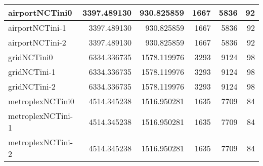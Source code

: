 \begin{longtable}{|l|r|r|r|r|r|}
airportNCTini0 & 3397.489130 & 930.825859 & 1667 & 5836 & 92 \\ \hline
airportNCTini-1 & 3397.489130 & 930.825859 & 1667 & 5836 & 92 \\ \hline
airportNCTini-2 & 3397.489130 & 930.825859 & 1667 & 5836 & 92 \\ \hline
gridNCTini0 & 6334.336735 & 1578.119976 & 3293 & 9124 & 98 \\ \hline
gridNCTini-1 & 6334.336735 & 1578.119976 & 3293 & 9124 & 98 \\ \hline
gridNCTini-2 & 6334.336735 & 1578.119976 & 3293 & 9124 & 98 \\ \hline
metroplexNCTini0 & 4514.345238 & 1516.950281 & 1635 & 7709 & 84 \\ \hline
metroplexNCTini-1 & 4514.345238 & 1516.950281 & 1635 & 7709 & 84 \\ \hline
metroplexNCTini-2 & 4514.345238 & 1516.950281 & 1635 & 7709 & 84 \\ \hline
\end{longtable}
